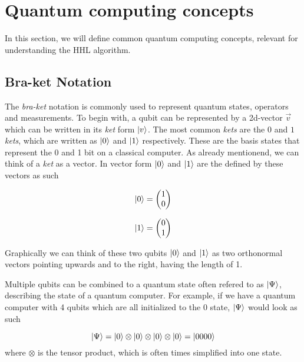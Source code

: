 \section{Quantum computing concepts}
In this section, we will define common quantum computing concepts, relevant for understanding the HHL algorithm.

\subsection{Bra-ket Notation}
The \textit{bra-ket} notation is commonly used to represent quantum states, operators and measurements.
To begin with, a qubit can be represented by a 2d-vector $\vec v$ which can be written in its \textit{ket} form $\ket v$.
The most common \textit{kets} are the $0$ and $1$ \textit{kets}, which are written as $\ket 0$ and $\ket 1$ respectively.
These are the basis states that represent the 0 and 1 bit on a classical computer. 
As already mentionend, we can think of a \textit{ket} as a vector. 
In vector form $\ket 0$ and $\ket 1$ are the defined by these vectors as such

\begin{equation}
  \ket 0  = \begin{pmatrix}1\\0\end{pmatrix} 
\end{equation}

\begin{equation}
  \ket 1  = \begin{pmatrix}0\\1\end{pmatrix}
\end{equation}

Graphically we can think of these two qubits $\ket 0$ and $\ket 1$ as two orthonormal vectors pointing upwards and to the right, having the length of 1.

Multiple qubits can be combined to a quantum state often refered to as $\ket \Psi$, describing the state of a quantum computer. 
For example, if we have a quantum computer with 4 qubits which are all initialized to the 0 state, $\ket \Psi$ would look as such

\begin{equation}
    \ket \Psi = \ket 0 \otimes \ket 0 \otimes \ket 0 \otimes \ket 0 = \ket{0000}
\end{equation}
where $\otimes$ is the tensor product, which is often times simplified into one state.

